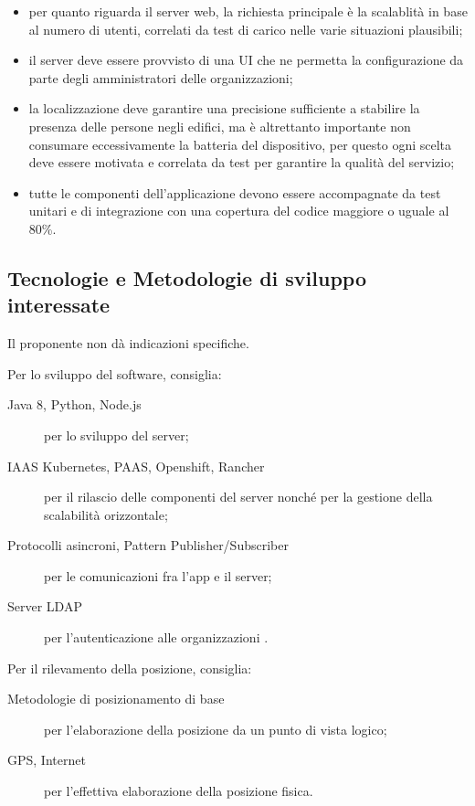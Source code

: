\documentclass[../studio-di-fattibilita.tex]{subfiles}
\begin{document}
\begin{itemize}
    \item per quanto riguarda il server web, la richiesta principale è la scalablità in base al numero di utenti, correlati da test di carico nelle varie situazioni plausibili;
    \item il server deve essere provvisto di una UI che ne permetta la configurazione da parte degli amministratori delle organizzazioni;
    \item la localizzazione deve garantire una precisione sufficiente a stabilire la presenza delle persone negli edifici, ma è altrettanto importante non consumare eccessivamente la batteria del dispositivo, per questo ogni scelta deve essere motivata e correlata da test per garantire la qualità del servizio;
    \item tutte le componenti dell’applicazione devono essere accompagnate da test unitari e di integrazione con una copertura del codice maggiore o uguale al 80\%.
  \end{itemize}


  \subsection{Tecnologie e Metodologie di sviluppo interessate}%
  \label{subsec:tecnologie_interessate}
  Il proponente non dà indicazioni specifiche.

  Per lo sviluppo del software, consiglia:
  \begin{description}
    \item[Java 8, Python, Node.js] per lo sviluppo del server;
    \item[IAAS Kubernetes, PAAS, Openshift, Rancher] per il rilascio delle componenti del server nonché per la gestione della scalabilità orizzontale;
    \item[Protocolli asincroni, Pattern Publisher/Subscriber] per le comunicazioni fra l'app e il server;
    \item[Server LDAP] per l'autenticazione alle organizzazioni .
  \end{description}

  Per il rilevamento della posizione, consiglia:
  \begin{description}
    \item[Metodologie di posizionamento di base] per l'elaborazione della posizione da un punto di vista logico;
    \item[GPS, Internet] per l'effettiva elaborazione della posizione fisica.
  \end{description}
\end{document}
